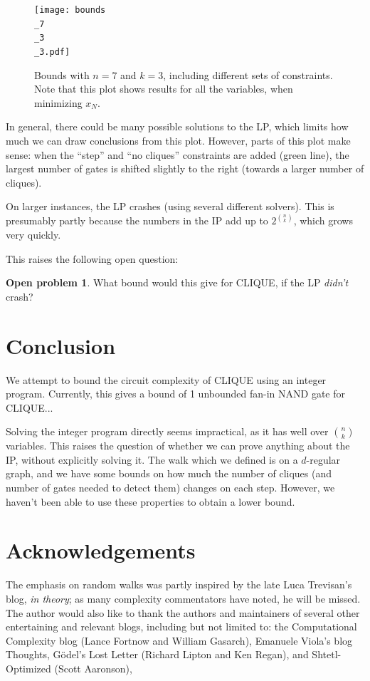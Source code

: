 \documentclass[12pt]{article}
\theoremstyle{definition}
\newtheorem{prob}{Open problem}[section]
\begin{document}
\begin{figure}

\centering

\texttt{[image: bounds\\\_7\\\_3\\\_3.pdf]}

\caption{
Bounds with $n=7$ and $k=3$, including different sets of constraints.
Note that this plot shows results for all the variables, when
minimizing $x_N$.
}
\label{fig:bounds0}

\end{figure}

In general, there could be many possible solutions to the LP, which
limits how much we can draw conclusions from this plot.
However, parts of this plot make sense: 
when the ``step'' and ``no cliques''
constraints are added (green line), the largest number of gates is shifted
slightly to the right (towards a larger number of cliques).

On larger instances, the LP crashes (using several different solvers). This
is presumably partly because the numbers in the IP add up to $2^{n \choose k}$,
which grows very quickly.

This raises the following open question:

\begin{prob}
What bound would this give for CLIQUE, if the LP {\em didn't} crash?
\end{prob}

\section{Conclusion}

We attempt to bound the circuit complexity of CLIQUE using an integer program.
Currently, this gives a bound
of 1 unbounded fan-in NAND gate for CLIQUE...

Solving the integer program directly seems impractical, as it has well over
${n \choose k}$ variables. This raises the question of whether we can prove
anything about the IP, without explicitly solving it.
The walk which we defined is on a $d$-regular graph, and we have some bounds on
how much the number of cliques (and number of gates needed to detect them)
changes on each step. However, we haven't been able to use these properties
to obtain a lower bound.

\section{Acknowledgements}

The emphasis on random walks was partly inspired by the late Luca
Trevisan's blog, {\em in theory}; as many complexity commentators
have noted, he will be missed. The author would also like to thank
the authors and maintainers of several other entertaining and
relevant blogs, including but not limited to: the Computational
Complexity blog (Lance Fortnow and William Gasarch), Emanuele Viola's
blog Thoughts, G\"odel's Lost Letter (Richard Lipton and Ken Regan),
and Shtetl-Optimized (Scott Aaronson),



\end{document}
